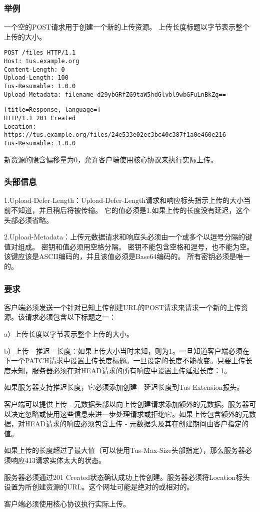 \documentclass[bachelor]{thesis-uestc}
\begin{document}
\subsubsection{举例}
一个空的POST请求用于创建一个新的上传资源。 上传长度标题以字节表示整个上传的大小。
\begin{lstlisting}[title=Request]
POST /files HTTP/1.1
Host: tus.example.org
Content-Length: 0
Upload-Length: 100
Tus-Resumable: 1.0.0
Upload-Metadata: filename d29ybGRfZG9taW5hdGlvbl9wbGFuLnBkZg==
\end{lstlisting}
\begin{lstlisting}[title=Response, language=]
HTTP/1.1 201 Created
Location: https://tus.example.org/files/24e533e02ec3bc40c387f1a0e460e216
Tus-Resumable: 1.0.0
\end{lstlisting}
新资源的隐含偏移量为0，允许客户端使用核心协议来执行实际上传。
\subsubsection{头部信息}
1.Upload-Defer-Length：Upload-Defer-Length请求和响应标头指示上传的大小当前不知道，并且稍后将被传输。 它的值必须是1.如果上传的长度没有延迟，这个头部必须省略。

2.Upload-Metadata：上传元数据请求和响应头必须由一个或多个以逗号分隔的键值对组成。 密钥和值必须用空格分隔。 密钥不能包含空格和逗号，也不能为空。 该键应该是ASCII编码的，并且该值必须是Base64编码的。 所有密钥必须是唯一的。
\subsubsection{要求}
客户端必须发送一个针对已知上传创建URL的POST请求来请求一个新的上传资源。该请求必须包含以下标题之一：
\par a）上传长度以字节表示整个上传的大小。
\par b）上传 - 推迟 - 长度：如果上传大小当时未知，则为1。一旦知道客户端必须在下一个PATCH请求中设置上传长度标题。一旦设定的长度不能改变。只要上传长度未知，服务器必须在对HEAD请求的所有响应中设置上传延迟长度：1。
\par 如果服务器支持推迟长度，它必须添加创建 - 延迟长度到Tus-Extension报头。
\par 客户端可以提供上传 - 元数据头部以向上传创建请求添加额外的元数据。服务器可以决定忽略或使用这些信息来进一步处理请求或拒绝它。如果上传包含额外的元数据，对HEAD请求的响应必须包含上传 - 元数据头及其在创建期间由客户指定的值。
\par 如果上传的长度超过了最大值（可以使用Tus-Max-Size头部指定），那么服务器必须响应413请求实体太大的状态。
\par 服务器必须通过201 Created状态确认成功上传创建。服务器必须将Location标头设置为所创建资源的URL。这个网址可能是绝对的或相对的。
\par 客户端必须使用核心协议执行实际上传。
\end{document}
